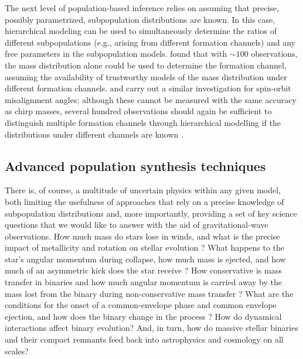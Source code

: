 \documentclass[iop,onecolumn]{revtex4}
\begin{document}
The next level of population-based inference relies on assuming that precise, possibly parametrized, subpopulation distributions are known.  In this case, hierarchical modeling \citep[extreme deconvolution in the language of][]{Hogg:2010} can be used to simultaneously determine the ratios of different subpopulations (e.g., arising from different formation channels) and any free parameters in the subpopulation models.  \citet{Zevin:2017} found that with $\sim 100$ observations, the mass distribution alone could be used to determine the formation channel, assuming the availability of trustworthy models of the mass distribution under different formation channels.  \citet{Vitale:2015} and \citet{Stevenson:2017spin} carry out a similar investigation for spin-orbit misalignment angles; although these cannot be measured with the same accuracy as chirp masses, several hundred observations should again be sufficient to distinguish multiple formation channels through hierarchical modelling if the distributions under different channels are known \citep{Stevenson:2017spin}.  

\subsection{Advanced population synthesis techniques}
There is, of course, a multitude of uncertain physics within any given model, both limiting the usefulness of approaches that rely on a precise knowledge of subpopulation distributions and, more importantly, providing a set of key science questions that we would like to answer with the aid of gravitational-wave observations.  How much mass do stars lose in winds, and what is the precise impact of metallicity and rotation on stellar evolution \citep[e.g.,][]{Renzo:2017}?  What happens to the star's angular momentum during collapse, how much mass is ejected, and how much of an asymmetric kick does the star receive \citep[e.g.,][]{Mirabel:2016}? How conservative is mass transfer in binaries and how much angular momentum is carried away by the mass lost from the binary during non-conservative mass transfer \citep[e.g.,][]{vandenHeuvel:2017}?  What are the conditions for the onset of a common-envelope phase and common envelope ejection, and how does the binary change in the process \citep[e.g.,][]{Ivanova:2013}?   How do dynamical interactions affect binary evolution?  And, in turn, how do massive stellar binaries and their compact remnants feed back into astrophysics and cosmology on all scales?
\end{document}
